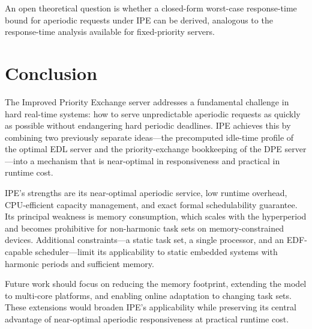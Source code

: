 \documentclass[conference]{IEEEtran}
\begin{document}
An open theoretical question is whether a closed-form
worst-case response-time bound for aperiodic requests under
IPE can be derived, analogous to the response-time analysis
available for fixed-priority servers.

\section{Conclusion}

The Improved Priority Exchange server addresses a fundamental
challenge in hard real-time systems: how to serve
unpredictable aperiodic requests as quickly as possible
without endangering hard periodic deadlines. IPE achieves
this by combining two previously separate ideas---the
precomputed idle-time profile of the optimal EDL server and
the priority-exchange bookkeeping of the DPE server---into a
mechanism that is near-optimal in responsiveness and
practical in runtime cost.

IPE's strengths are its near-optimal aperiodic service, low
runtime overhead, CPU-efficient capacity management, and
exact formal schedulability guarantee. Its principal weakness
is memory consumption, which scales with the hyperperiod and
becomes prohibitive for non-harmonic task sets on
memory-constrained devices. Additional constraints---a static
task set, a single processor, and an EDF-capable
scheduler---limit its applicability to static embedded
systems with harmonic periods and sufficient memory.

Future work should focus on reducing the memory footprint,
extending the model to multi-core platforms, and enabling
online adaptation to changing task sets. These extensions
would broaden IPE's applicability while preserving its
central advantage of near-optimal aperiodic responsiveness
at practical runtime cost.
\end{document}
